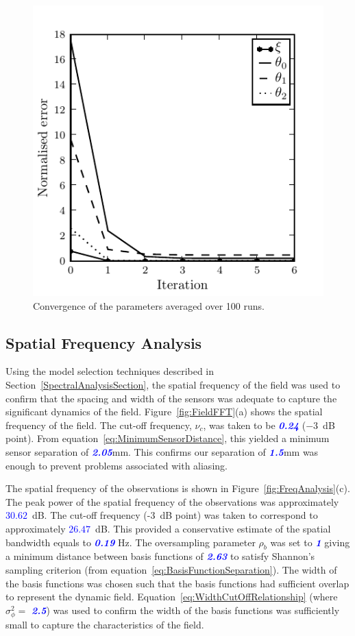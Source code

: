 \documentclass[twocolumn,11pt,a4paper]{article}		%
\newcommand{\parham}[1]{\textsf{\emph{\textbf{\textcolor{blue}{#1}}}}}
\begin{document}
\begin{figure}[th]
\includegraphics[scale=1]{./Graph/convergence.pdf}
\caption{Convergence of the parameters averaged over 100 runs. }
\label{fig:ParametersConvergence}
\end{figure}
\subsection{Spatial Frequency Analysis} 
Using the model selection techniques described in Section~\ref{SpectralAnalysisSection}, the spatial frequency of the field was used to confirm that the spacing and width of the sensors was adequate to capture the significant dynamics of the field. Figure~\ref{fig:FieldFFT}(a) shows the spatial frequency of the field. The cut-off frequency, $\nu_c$, was taken to be \parham{0.24} ($-3$~dB point). From equation~\ref{eq:MinimumSensorDistance}, this yielded a minimum sensor separation of \parham{2.05}mm. This confirms our separation of \parham{1.5}mm was enough to prevent problems associated with aliasing.

The spatial frequency of the observations is shown in Figure~\ref{fig:FreqAnalysis}(c). The peak power of the spatial frequency of the observations was approximately \parham{$30.62$}~dB. The cut-off frequency (-3~dB point) was taken to correspond to  approximately \parham{$26.47$}~dB. This provided a conservative estimate of the spatial bandwidth equals to \parham{0.19} Hz. The oversampling parameter $\rho_b$ was set to \parham{1} giving a minimum distance between basis functions of \parham{2.63} to satisfy Shannon's sampling criterion (from equation~\ref{eq:BasisFunctionSeparation}). The width of the basis functions was chosen such that the basis functions had sufficient overlap to represent the dynamic field. Equation~\ref{eq:WidthCutOffRelationship} (where $\sigma_{\phi}^2 = $ \parham{2.5}) was used to confirm the width of the basis functions was sufficiently small to capture the characteristics of the field.
\end{document}
